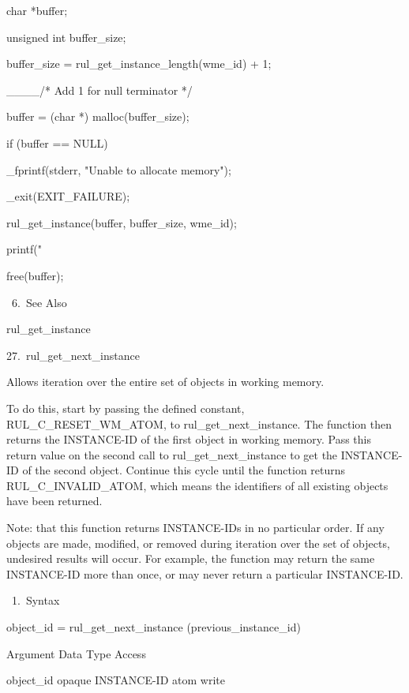           {

          char *buffer;

          unsigned int buffer_size;

          buffer_size =
          rul_get_instance_length(wme_id) + 1;

          ____/* Add 1 for null terminator */

          buffer = (char *)
          malloc(buffer_size);

          if (buffer == NULL) {

          _fprintf(stderr, "Unable to allocate
          memory");

          _exit(EXIT_FAILURE);

          }

          rul_get_instance(buffer,
          buffer_size, wme_id);

          printf("%

          free(buffer);

       6. See Also

    rul_get_instance

27. rul_get_next_instance

    Allows iteration over the entire set of
    objects in working memory.

    To do this, start by passing the defined
    constant, RUL_C_RESET_WM_ATOM, to
    rul_get_next_instance. The function then
    returns the INSTANCE-ID of the first
    object in working memory. Pass this return
    value on the second call to
    rul_get_next_instance to get the
    INSTANCE-ID of the second object. Continue
    this cycle until the function returns
    RUL_C_INVALID_ATOM, which means the
    identifiers of all existing objects have
    been returned.

    Note: that this function returns
    INSTANCE-IDs in no particular order. If
    any objects are made, modified, or removed
    during iteration over the set of objects,
    undesired results will occur. For example,
    the function may return the same
    INSTANCE-ID more than once, or may never
    return a particular INSTANCE-ID.

       1. Syntax

          object_id = rul_get_next_instance
          (previous_instance_id)

          Argument  Data Type     Access

          object_id  opaque INSTANCE-ID atom
           write

}
